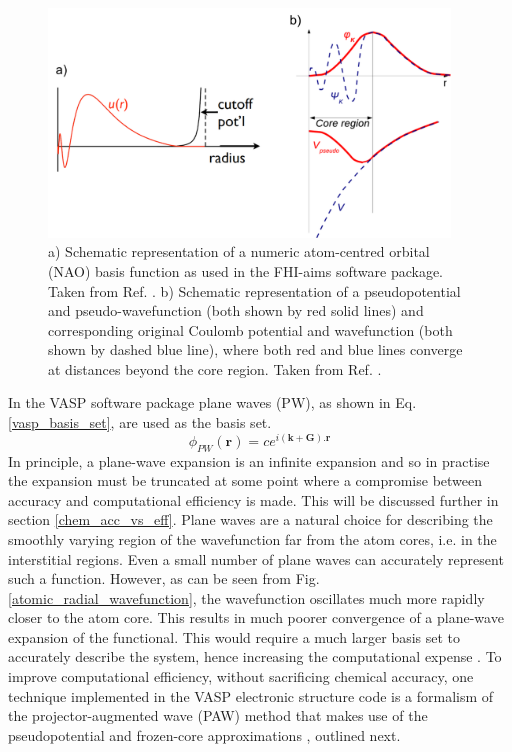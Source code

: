 \documentclass[11pt, twoside]{report}
\begin{document}
\begin{figure}[h!]
  \centering
    \includegraphics[width=0.95\textwidth]{figures/NACBF+PP.png}
    \caption[a) Schematic representation of a numeric atom-centred orbital (NAO) basis function as used in the FHI-aims software package. b) Schematic representation of a pseudopotential and pseudo-wavefunction (both shown by red solid lines) and corresponding original Coulomb potential and wavefunction (both shown by dashed blue line), where both red and blue lines converge at distances beyond the core region.]{a) Schematic representation of a numeric atom-centred orbital (NAO) basis function as used in the FHI-aims software package. Taken from Ref. . b) Schematic representation of a pseudopotential and pseudo-wavefunction (both shown by red solid lines) and corresponding original Coulomb potential and wavefunction (both shown by dashed blue line), where both red and blue lines converge at distances beyond the core region. Taken from Ref. .}
  \label{NACBF+PP}
\end{figure}

In the VASP software package \cite{VASP} plane waves (PW), as shown in Eq. \ref{vasp_basis_set}, are used as the basis set. 
\begin{equation}\label{vasp_basis_set}
\phi_{PW}(\mathbf{r}) = ce^{i(\mathbf{k}+\mathbf{G}).\mathbf{r}}
\end{equation}
In principle, a plane-wave expansion is an infinite expansion and so in practise the expansion must be truncated at some point where a compromise between accuracy and computational efficiency is made. This will be discussed further in section \ref{chem_acc_vs_eff}. Plane waves are a natural choice for describing the smoothly varying region of the wavefunction far from the atom cores, i.e. in the interstitial regions. Even a small number of plane waves can accurately represent such a function. However, as can be seen from Fig. \ref{atomic_radial_wavefunction}, the wavefunction oscillates much more rapidly closer to the atom core. This results in much poorer convergence of a plane-wave expansion of the functional. This would require a much larger basis set to accurately describe the system, hence increasing the computational expense \cite{Prasad_ch5}. To improve computational efficiency, without sacrificing chemical accuracy, one technique implemented in the VASP electronic structure code is a formalism of the projector-augmented wave (PAW) method \cite{PAW} that makes use of the pseudopotential and frozen-core approximations \cite{PAW_VASP}, outlined next.
\end{document}
